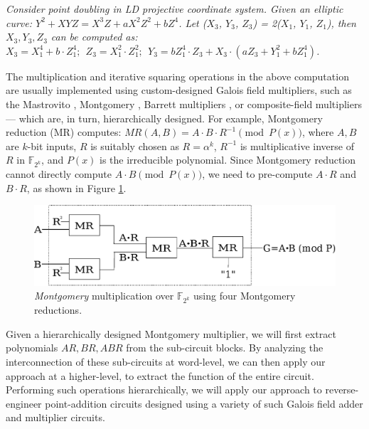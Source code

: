 \begin{Example}
{\it 
Consider point doubling in LD projective coordinate system. Given an
elliptic curve: $Y^2 + XYZ = X^3Z + aX^2Z^2 + bZ^4$.  
Let  ($X_3$, $Y_3$, $Z_3$) = 2($X_1$, $Y_1$, $Z_1$), then $X_3, Y_3,
Z_3$ can be computed as: $X_3 = X_1^4 + b \cdot Z_1^4; ~~Z_3 = X_1^2
\cdot Z_1^2; ~~Y_3 = b Z_1^4 \cdot Z_3 + X_3 \cdot (aZ_3 + Y_1^2 +
bZ_1^4 )$. 
}
\end{Example}

The multiplication and iterative squaring operations in the above
computation are usually implemented using custom-designed Galois field
multipliers, such as the Mastrovito \cite{mastro:1989}, Montgomery
\cite{acar:1998}, Barrett multipliers \cite{Knezevic:2008}, or
composite-field multipliers \cite{cfmulti:1996} --- which are, in
turn, hierarchically designed.  
For example, Montgomery reduction (MR)
computes: $MR(A,B)=A\cdot B \cdot R^{-1} \pmod {P(x)}$, 
where $A,B$ are $k$-bit inputs, $R$ is suitably chosen as
$R={\alpha}^k$, $R^{-1}$ is multiplicative inverse of $R$ in
${\mathbb{F}}_{2^k}$, and $P(x)$ is the irreducible polynomial.
Since Montgomery reduction cannot directly compute $A\cdot B \pmod
{P(x)}$, we need to pre-compute $A\cdot R$ and $B\cdot R$, as shown in
Figure \ref{fig:mm4}.   

\begin{figure}[hbt]
	\begin{center}
	\includegraphics[scale=0.4]{../new_mmcircuit.eps}
	\end{center}
	\caption{{\it Montgomery} multiplication over $\mathbb{F}_{2^k}$
          using four Montgomery reductions.}
	\label{fig:mm4}
\end{figure}

Given a hierarchically designed Montgomery multiplier, we will first
extract polynomials $AR, BR, ABR$ from the sub-circuit blocks. By
analyzing the interconnection of these sub-circuits at word-level, we
can then apply our approach at a higher-level, to extract the function
of the entire circuit. Performing such operations hierarchically, we
will apply our approach to reverse-engineer point-addition circuits
designed using a variety of such Galois field adder and multiplier
circuits.  
